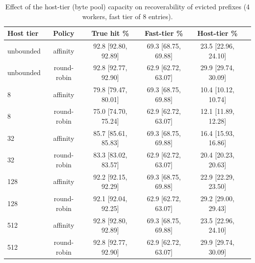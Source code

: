 \begin{table}[t]
\centering
\scriptsize
\setlength{\tabcolsep}{2.5pt}
\caption{Effect of the host-tier (byte pool) capacity on recoverability of evicted prefixes (4 workers, fast tier of 8 entries).}
\label{tab:host-capacity}
\begin{tabular}{lccccc}
\toprule
Host tier & Policy & True hit \% & Fast-tier \% & Host-tier \% \\
\midrule
unbounded & affinity & 92.8 \tiny [92.80, 92.89] & 69.3 \tiny [68.75, 69.88] & 23.5 \tiny [22.96, 24.10] \\
unbounded & round-robin & 92.8 \tiny [92.77, 92.90] & 62.9 \tiny [62.72, 63.07] & 29.9 \tiny [29.74, 30.09] \\
8 & affinity & 79.8 \tiny [79.47, 80.01] & 69.3 \tiny [68.75, 69.88] & 10.4 \tiny [10.12, 10.74] \\
8 & round-robin & 75.0 \tiny [74.70, 75.24] & 62.9 \tiny [62.72, 63.07] & 12.1 \tiny [11.89, 12.28] \\
32 & affinity & 85.7 \tiny [85.61, 85.83] & 69.3 \tiny [68.75, 69.88] & 16.4 \tiny [15.93, 16.86] \\
32 & round-robin & 83.3 \tiny [83.02, 83.57] & 62.9 \tiny [62.72, 63.07] & 20.4 \tiny [20.23, 20.63] \\
128 & affinity & 92.2 \tiny [92.15, 92.29] & 69.3 \tiny [68.75, 69.88] & 22.9 \tiny [22.29, 23.50] \\
128 & round-robin & 92.1 \tiny [92.04, 92.25] & 62.9 \tiny [62.72, 63.07] & 29.2 \tiny [29.00, 29.43] \\
512 & affinity & 92.8 \tiny [92.80, 92.89] & 69.3 \tiny [68.75, 69.88] & 23.5 \tiny [22.96, 24.10] \\
512 & round-robin & 92.8 \tiny [92.77, 92.90] & 62.9 \tiny [62.72, 63.07] & 29.9 \tiny [29.74, 30.09] \\
\bottomrule
\end{tabular}
\end{table}
